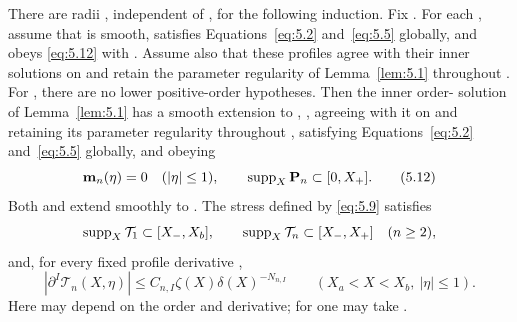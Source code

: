 \begin{lemma}\label{lem:5.2}
There are radii , independent of , for the following induction.
Fix . For each , assume that  is smooth, satisfies
Equations~\eqref{eq:5.2} and~\eqref{eq:5.5} globally, and obeys \eqref{eq:5.12} with
. Assume also that these profiles agree with their inner solutions on
 and retain the parameter regularity of Lemma~\ref{lem:5.1} throughout
. For , there are no lower positive-order hypotheses. Then the inner
order- solution of Lemma~\ref{lem:5.1} has a smooth extension to
, , agreeing with it on
 and retaining its parameter regularity throughout
, satisfying Equations~\eqref{eq:5.2} and~\eqref{eq:5.5} globally, and obeying
\begin{equation}\label{eq:5.12}
\mathbf m_n(\eta)=0\quad (|\eta|\leq1),
\qquad
\operatorname{supp}_X\mathbf P_n\subset[0,X_+].
\tag{5.12}
\end{equation}
Both  and  extend smoothly to
. The stress defined by \eqref{eq:5.9} satisfies
\[
\operatorname{supp}_X\mathcal T_1\subset[X_-,X_b],
\qquad
\operatorname{supp}_X\mathcal T_n\subset[X_-,X_+]\quad(n\geq2),
\]
and, for every fixed profile derivative ,
\begin{equation}\label{eq:5.13}
|\partial^I\mathcal T_n(X,\eta)|
\leq C_{n,I}\zeta(X)\delta(X)^{-N_{n,I}}
\qquad (X_a<X<X_b,\ |\eta|\leq1).
\tag{5.13}
\end{equation}
Here  may depend on the order and derivative; for
 one may take .
\end{lemma}

